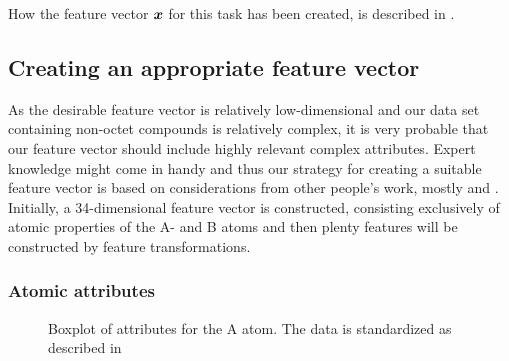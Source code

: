 How the feature vector $\bm{x}$ for this task has been created, is described in .


\subsection{Creating an appropriate feature vector}\label{sec:physicsfeaturevector}
As the desirable feature vector is relatively low-dimensional and our data set containing non-octet compounds is relatively complex, it is very probable that our feature vector should include highly relevant complex attributes. Expert knowledge might come in handy and thus our strategy for creating a suitable feature vector is based on considerations from other people's work, mostly \citep{frameworkforML} and \citep{criticalrole_descriptor}. Initially, a 34-dimensional feature vector is constructed, consisting exclusively of atomic properties of the A- and B atoms and then plenty features will be constructed by feature transformations.

\subsubsection{Atomic attributes}\label{sec:atomic_att}

\basic
\begin{figure}[ht]
    \centering
    \iffigure
    \fi
    \caption[Box-plots for the initial 17 attributes of the A atom]{Boxplot of attributes for the A atom. The data is standardized as described in }
    \label{fig:boxplotA}
\end{figure}

